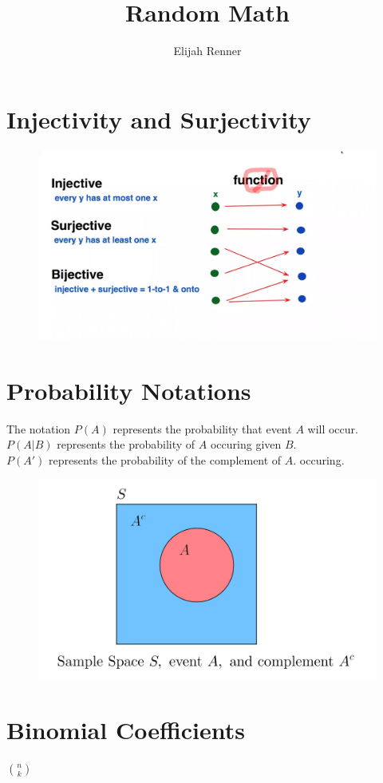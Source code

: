 \message{ !name(random_math.tex)}\documentclass[12pt]{article}
\title{Random Math}
\author{Elijah Renner}
\begin{document}


\maketitle

\vspace{0.5in}

\tableofcontents

\section{Injectivity and Surjectivity}

\begin{figure}[H]
	\centering
	\includegraphics[scale=0.3]{media/maxresdefault.jpg}
\end{figure}

\section{Probability Notations}

The notation \(P(A)\) represents the probability that event \(A\) will occur.\\

\(P(A|B)\) represents the probability of \(A\) occuring given \(B\).\\

\(P(A')\) represents the probability of the complement of \(A\).
occuring.\\

\begin{figure}[H]
	\centering
	\includegraphics[scale=0.3]{media/compliment.png}
\end{figure}

\section{Binomial Coefficients}

\({n}\choose{k}\)
\end{document}
